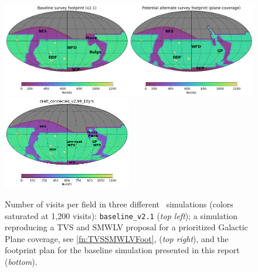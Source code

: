 \begin{figure}
    \centering
    \includegraphics[width=0.5\textwidth]{figures/fp0.png}\includegraphics[width=0.5\textwidth]{figures/fp1.png}
    \includegraphics[width=0.5\textwidth]{figures/fp_299.png}
    \caption{Number of visits per field in three different \opsim\ simulations (colors saturated at 1,200 visits):  \texttt{baseline\_v2.1} (\emph{top left}); a simulation reproducing a TVS and SMWLV proposal for a prioritized Galactic Plane coverage, see \autoref{fn:TVSSMWLVFoot},
    (\emph{top right}), and the footprint plan for the baseline simulation presented in this report (\emph{bottom}).}
    \label{fig:fp}
\end{figure}

